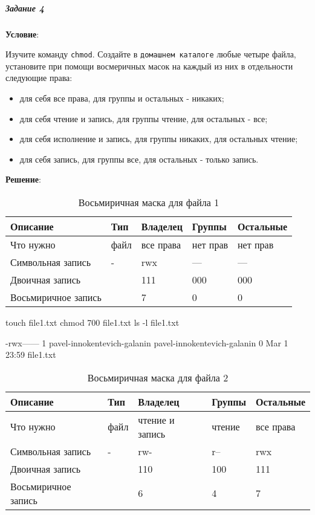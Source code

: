 \subparagraph{Задание 4} \textbf{Условие}:

Изучите команду \verb|chmod|.
Создайте в \verb|домашнем каталоге| любые четыре файла, установите при помощи восмеричных масок на каждый из них в отдельности следующие права:
\begin{itemize}
\item для себя все права, для группы и остальных - никаких;
\item для себя чтение и запись, для группы чтение, для остальных - все;
\item для себя исполнение и запись, для группы никаких, для остальных чтение;
\item для себя запись, для группы все, для остальных - только запись.
\end{itemize}

\textbf{Решение}:

\begin{table}[h!]
    \centering
    \caption{Восьмиричная маска для файла 1}
    \begin{tabular}{ | l | l | l | l | l | }
        \hline
        Описание            & Тип   & Владелец  & Группы    & Остальные \\ \hline
        \hline
        Что нужно           & файл  & все права & нет прав  & нет прав  \\ \hline
        Символьная запись 	& -     & rwx 	    & --- 	    & ---       \\ \hline
        Двоичная запись     & 	    & 111 	    & 000 	    & 000       \\ \hline
        Восьмиричное запись & 	    & 7 	    & 0 	    & 0         \\ \hline
    \end{tabular}
\end{table}

\begin{BashBox}
    touch file1.txt
    chmod 700 file1.txt
    ls -l file1.txt
\end{BashBox}

\begin{OutBox}
    -rwx------ 1 pavel-innokentevich-galanin pavel-innokentevich-galanin 0 Mar  1 23:59 file1.txt
\end{OutBox}

\begin{table}[h!]
    \centering
    \caption{Восьмиричная маска для файла 2}
    \begin{tabular}{ | l | l | l | l | l | }
        \hline
        Описание            & Тип   & Владелец          & Группы    & Остальные \\ \hline
        \hline
        Что нужно           & файл  & чтение и запись   & чтение    & все права \\ \hline
        Символьная запись 	& -     & rw- 	            & r-- 	    & rwx       \\ \hline
        Двоичная запись     & 	    & 110 	            & 100 	    & 111       \\ \hline
        Восьмиричное запись & 	    & 6 	            & 4 	    & 7         \\ \hline
    \end{tabular}
\end{table}

